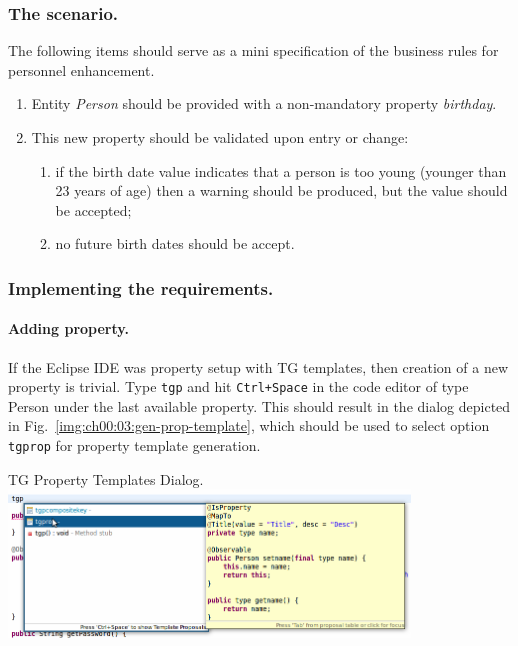   \subsubsection*{The scenario.}
  The following items should serve as a mini specification of the business rules for personnel enhancement.
  
  \begin{enumerate}
    \item Entity \emph{Person} should be provided with a non-mandatory property \emph{birthday}.
    \item This new property should be validated upon entry or change: 
	\begin{enumerate}
	  \item if the birth date value indicates that a person is too young (younger than 23 years of age) then a warning should be produced, but the value should be accepted;
	  \item no future birth dates should be accept.
	\end{enumerate}
  \end{enumerate}

  \subsubsection*{Implementing the requirements.}

  \paragraph*{Adding property.} 
  If the Eclipse IDE was property setup with TG templates, then creation of a new property is trivial.
  Type \texttt{tgp} and hit \texttt{Ctrl+Space} in the code editor of type Person under the last available property.
  This should result in the dialog depicted in Fig.~\ref{img:ch00:03:gen-prop-template}, which should be used to select option \texttt{tgprop} for property template generation.

  \begin{image}{TG Property Templates Dialog.}{\label{img:ch00:03:gen-prop-template}}
    \includegraphics[width=0.8\textwidth]{parts/00-part/chapters/02-making-changes/images/02-birthday-property-gen.png}
  \end{image}

